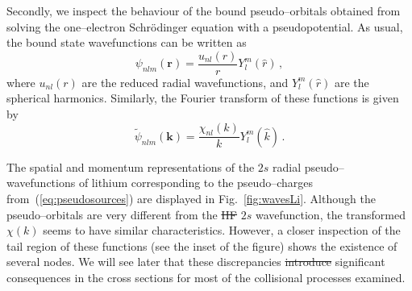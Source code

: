 \documentclass[10pt]{article}
\providecommand{\DIFaddtex}[1]{{\protect\color{blue}\uwave{#1}}} %
\providecommand{\DIFdeltex}[1]{{\protect\color{red}\sout{#1}}}                      %
\providecommand{\DIFaddbegin}{} %
\providecommand{\DIFaddend}{} %
\providecommand{\DIFdelbegin}{} %
\providecommand{\DIFdelend}{} %
\providecommand{\DIFadd}[1]{\texorpdfstring{\DIFaddtex{#1}}{#1}} %
\providecommand{\DIFdel}[1]{\texorpdfstring{\DIFdeltex{#1}}{}} %
\begin{document}
Secondly, we inspect the behaviour of the bound pseudo--orbitals 
obtained from solving the one--electron Schr\"odinger equation with a 
pseudopotential. As usual, the bound state wavefunctions can be 
written as
\begin{equation}
 \psi_{nlm}(\mathbf{r}) = \frac{u_{nl}(r)}{r}Y_l^m(\hat{r})\,,
 \label{eq:centralfield-wave}
\end{equation}
where $u_{nl}(r)$ are the reduced radial wavefunctions, and 
$Y_l^m(\hat{r})$ are the spherical harmonics. Similarly, the Fourier 
transform of these functions is given by
\begin{equation}
 \widetilde{\psi}_{nlm}(\mathbf{k}) =
 \frac{\chi_{nl}(k)}{k}Y_l^m(\hat{k})\,.
\end{equation}

The spatial and momentum representations of the $2s$ radial 
pseudo--wavefunctions of lithium corresponding to the pseudo--charges 
from~(\ref{eq:pseudosources}) are displayed in Fig.~\ref{fig:wavesLi}.
Although the pseudo--orbitals are very different from the \DIFdelbegin \DIFdel{HF }\DIFdelend \DIFaddbegin \DIFadd{DIM }\DIFaddend $2s$ 
wavefunction, the transformed $\chi(k)$ seems to have similar 
characteristics. However, a closer inspection of the tail region of 
these functions (see the inset of the figure) shows the existence of 
several nodes. We will see later that these discrepancies \DIFdelbegin \DIFdel{introduce }\DIFdelend \DIFaddbegin \DIFadd{have 
}\DIFaddend significant consequences in the cross sections for most of the 
collisional processes examined.
\end{document}
